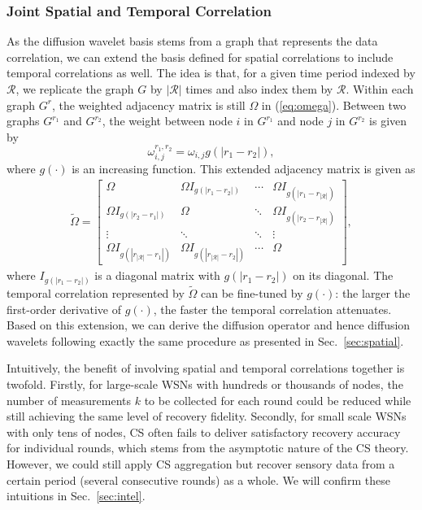 \documentclass[conference]{IEEEtran}
\begin{document}
    \subsubsection{Joint Spatial and Temporal Correlation} \label{sec:jstc}
As the diffusion wavelet basis stems from a graph that represents the data correlation, we can extend the basis defined for spatial correlations to include temporal correlations as well. The idea is that, for a given time period indexed by $\mathcal{R}$, we replicate the graph $G$ by $|\mathcal{R}|$ times and also index them by $\mathcal{R}$. Within each graph $G^r$, the weighted adjacency matrix is still $\Omega$ in (\ref{eq:omega}). Between two graphs $G^{r_1}$ and $G^{r_2}$, the weight between node $i$ in $G^{r_1}$ and node $j$ in $G^{r_2}$ is given by
      \[\omega_{i,j}^{r_1,r_2} = \omega_{i,j} g(|r_1 - r_2|),\]
where $g(\cdot)$ is an increasing function. This extended adjacency matrix is given as
\begin{eqnarray}
\tilde{\Omega} = \!\!
                \left[
                  \begin{array}{cccc}
                    \Omega & \!\!\Omega I_{g(|r_1 - r_2|)} & \cdots & \Omega I_{g(|r_1 - r_{|\mathcal{R}|})}\!\! \\
                    \!\!\Omega I_{g(|r_2 - r_1|)} & \Omega & \ddots & \Omega I_{g(|r_2 - r_{|\mathcal{R}|})}\!\! \\
                    \vdots & \ddots & \ddots & \vdots \\
                    \!\!\Omega I_{g(|r_{|\mathcal{R}|} - r_1|)} & \!\!\Omega I_{g(|r_{|\mathcal{R}|} - r_2|)} & \cdots & \Omega
                 \end{array}
               \right], \nonumber
\end{eqnarray}
where $I_{g(|r_1 - r_2|)}$ is a diagonal matrix with $g(|r_1 - r_2|)$ on its diagonal. The temporal correlation represented by $\tilde{\Omega}$ can be fine-tuned by $g(\cdot)$: the larger the first-order derivative of $g(\cdot)$, the faster the temporal correlation attenuates. Based on this extension, we can derive the diffusion operator and hence diffusion wavelets following exactly the same procedure as presented in Sec.~\ref{sec:spatial}.

      Intuitively, the benefit of involving spatial and temporal correlations together is twofold. Firstly, for large-scale WSNs with hundreds or thousands of nodes, the number of measurements $k$ to be collected for each round could be reduced while still achieving the same level of recovery fidelity. Secondly, for small scale WSNs with only tens of nodes, CS often fails to deliver satisfactory recovery accuracy for individual rounds, which stems from the asymptotic nature of the CS theory. However, we could still apply CS aggregation but recover sensory data from a certain period (several consecutive rounds) as a whole. We will confirm these intuitions in Sec.~\ref{sec:intel}.
\end{document}
